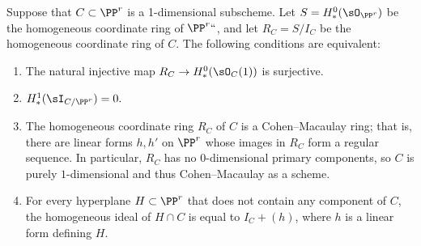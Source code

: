 \begin{proposition}\label{ACM basics}
Suppose that $C\subset \PP^r$ is a 1-dimensional subscheme. Let $S = H^0_*(\sO_{\PP^r})$
be the homogeneous coordinate ring of $\PP^r` `$, and let $R_C = S/I_C$ be the homogeneous
coordinate ring of $C$. The following conditions are equivalent:
\begin{enumerate}

 \item The natural injective map $R_C \to H^0_*(\sO_{C}(1))$ is surjective.

\item $H^1_*(\sI_{C/\PP^r}) = 0.$

\item The homogeneous coordinate ring $R_C$ of $C$ is a Cohen--Macaulay ring; that is, there are linear forms $h,h'$ on $\PP^r$ whose images in  $R_C$ form a regular sequence. In particular, $R_C$ has no $0$-dimensional primary components,
so $C$ is purely $1$-dimensional and thus Cohen--Macaulay as a scheme.
%

 \item For every hyperplane $H\subset \PP^r$ that does not contain any component of $C$,
 the homogeneous ideal of $H\cap C$
 is equal to  $I_C+(h)$, where $h$ is a linear form defining $H$.
\end{enumerate}
\end{proposition}

